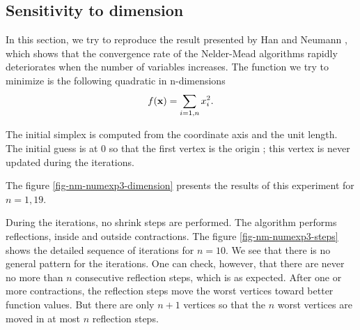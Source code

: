 \subsection{Sensitivity to dimension}

In this section, we try to reproduce the result 
presented by Han and Neumann \cite{HanNeumann2006}, which shows that the 
convergence rate of the Nelder-Mead algorithms rapidly 
deteriorates when the number of variables increases.
The function we try to minimize is the following quadratic 
in n-dimensions 
\begin{eqnarray}
\label{quadratic-function3}
f(\bold{x}) = \sum_{i=1,n} x_i^2.
\end{eqnarray}

The initial simplex is computed from the coordinate axis and the unit length.
The initial guess is at 0 so that the first vertex is the origin ; 
this vertex is never updated during the iterations.

The figure \ref{fig-nm-numexp3-dimension} presents the results of this 
experiment for $n=1,19$. 

During the iterations, no shrink steps are performed. The 
algorithm performs reflections, inside and outside contractions.
The figure \ref{fig-nm-numexp3-steps} shows the detailed sequence of 
iterations for $n=10$. We see that there is no general 
pattern for the iterations. One can check, however, that there 
are never no more than $n$ consecutive reflection steps, which is 
as expected. After one or more contractions, the reflection
steps move the worst vertices toward better function values.
But there are only $n+1$ vertices so that the $n$ worst 
vertices are moved in at most $n$ reflection steps.

